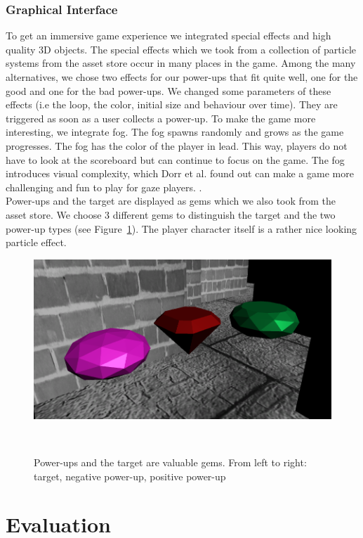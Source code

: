\documentclass{sigchi}
\begin{document}
\subsubsection{Graphical Interface} 
To get an immersive game experience we integrated special effects and high quality 3D objects. The special effects which we took from a collection of particle systems from the asset store occur in many places in the game. Among the many alternatives, we chose two effects for our power-ups that fit quite well, one for the good and one for the bad power-ups. We changed some parameters of these effects (i.e the loop, the color, initial size and behaviour over time). They are triggered as soon as a user collects a power-up. To make the game more interesting, we integrate fog. The fog spawns randomly and grows as the game progresses. The fog has the color of the player in lead. This way, players do not have to look at the scoreboard but can continue to focus on the game. The fog introduces visual complexity, which Dorr et al. found out can make a game more challenging and fun to play for gaze players. \cite{dorr2009gaze} .\\
Power-ups and the target are displayed as gems which we also took from the asset store. We choose 3 different gems to distinguish the target and the two power-up types  (see Figure~\ref{fig:figure4}). The player character itself is a rather nice looking particle effect.
\begin{figure}
\centering
  \includegraphics[width=0.9\columnwidth]{figures/gems}
  \caption{Power-ups and the target are valuable gems. From left to right: target, negative power-up, positive power-up}~\label{fig:figure4}
\end{figure}

\section{Evaluation}
\end{document}
